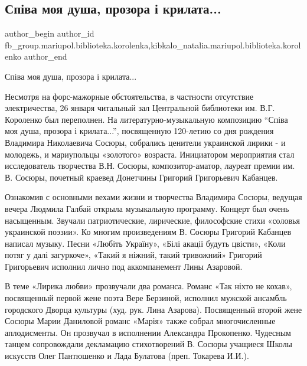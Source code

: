  
 
 
 
 

\subsection{Співа моя душа, прозора і крилата...}
\label{sec:28_01_2018.fb.fb_group.mariupol.biblioteka.korolenka.1.sp_va_moya_dusha__pr}
 
\ifcmt
 author_begin
   author_id fb_group.mariupol.biblioteka.korolenka,kibkalo_natalia.mariupol.biblioteka.korolenko
 author_end
\fi

Співа моя душа, прозора і крилата...

Несмотря на форс-мажорные обстоятельства, в частности отсутствие электричества,
26 января читальный зал Центральной библиотеки им. В.Г. Короленко был
переполнен. На литературно-музыкальную композицию \enquote{Співа моя душа, прозора і
крилата...}, посвященную 120-летию со дня рождения Владимира Николаевича
Сосюры, собрались ценители украинской лирики - и молодежь, и мариупольцы
«золотого» возраста. Инициатором мероприятия стал исследователь творчества В.Н.
Сосюры, композитор-аматор, лауреат премии им. В. Сосюры, почетный краевед
Донетчины Григорий Григорьевич Кабанцев.

Ознакомив с основными вехами жизни и творчества Владимира Сосюры, ведущая
вечера Людмила Галбай открыла музыкальную программу. Концерт был очень
насыщенным. Звучали патриотические, лирические, философские стихи «соловья
украинской поэзии». Ко многим произведениям В. Сосюры Григорий Кабанцев написал
музыку. Песни «Любіть Україну», «Білі акації будуть цвісти»,  «Коли потяг у
далі загуркоче», «Такий я ніжний, такий тривожний» Григорий Григорьевич
исполнил лично под аккомпанемент Лины Азаровой. 

В теме «Лирика любви» прозвучали два романса. Романс «Так ніхто не кохав»,
посвященный первой жене поэта Вере Берзиной, исполнил мужской ансамбль
городского Дворца культуры (худ. рук. Лина Азарова). Посвященный второй жене
Сосюры Марии Даниловой романс «Марія» также собрал многочисленные аплодисменты.
Он прозвучал в исполнении Александра Прокопенко. Чудесным танцем сопровождали
декламацию стихотворений  В. Сосюры учащиеся Школы искусств Олег Пантюшенко и
Лада Булатова (преп. Токарева И.И.). 

